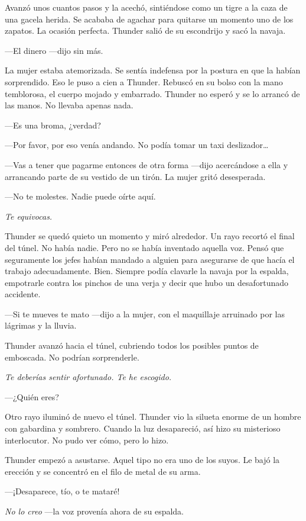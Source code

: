 Avanzó unos cuantos pasos y la acechó, sintiéndose como un tigre a la caza de una gacela herida. Se acababa de agachar para quitarse un momento uno de los zapatos. La ocasión perfecta. Thunder salió de su escondrijo y sacó la navaja.

---El dinero ---dijo sin más.

La mujer estaba atemorizada. Se sentía indefensa por la postura en que la habían sorprendido. Eso le puso a cien a Thunder. Rebuscó en su bolso con la mano temblorosa, el cuerpo mojado y embarrado. Thunder no esperó y se lo arrancó de las manos. No llevaba apenas nada.

---Es una broma, ¿verdad?

---Por favor, por eso venía andando. No podía tomar un taxi deslizador\dots

---Vas a tener que pagarme entonces de otra forma ---dijo acercándose a ella y arrancando parte de su vestido de un tirón. La mujer gritó desesperada.

---No te molestes. Nadie puede oírte aquí.

\emph{Te equivocas.}

Thunder se quedó quieto un momento y miró alrededor. Un rayo recortó el final del túnel. No había nadie. Pero no se había inventado aquella voz. Pensó que seguramente los jefes habían mandado a alguien para asegurarse de que hacía el trabajo adecuadamente. Bien. Siempre podía clavarle la navaja por la espalda, empotrarle contra los pinchos de una verja y decir que hubo un desafortunado accidente.

---Si te mueves te mato ---dijo a la mujer, con el maquillaje arruinado por las lágrimas y la lluvia.

Thunder avanzó hacia el túnel, cubriendo todos los posibles puntos de emboscada. No podrían sorprenderle.

\emph{Te deberías sentir afortunado. Te he escogido.}

---¿Quién eres?

Otro rayo iluminó de nuevo el túnel. Thunder vio la silueta enorme de un hombre con gabardina y sombrero. Cuando la luz desapareció, así hizo su misterioso interlocutor. No pudo ver cómo, pero lo hizo.

Thunder empezó a asustarse. Aquel tipo no era uno de los suyos. Le bajó la erección y se concentró en el filo de metal de su arma.

---¡Desaparece, tío, o te mataré!

\emph{No lo creo} ---la voz provenía ahora de su espalda.

